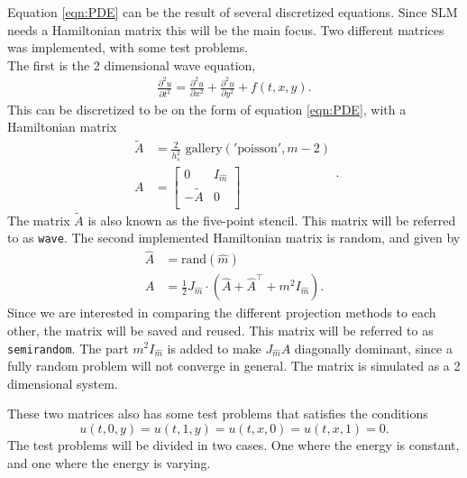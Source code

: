 Equation \eqref{eqn:PDE} can be the result of several discretized equations. Since SLM needs a Hamiltonian matrix this will be the main focus. Two different matrices was implemented, with some test problems.\\

The first is the 2 dimensional wave equation, 
\begin{equation}
\begin{aligned}
\frac{\partial^2 u}{\partial t^2} = \frac{\partial^2 u}{\partial x^2}+ \frac{\partial^2 u}{\partial y^2} + f(t,x,y).
\end{aligned}
\label{eqn:wave}
\end{equation}
This can be discretized to be on the form of equation \eqref{eqn:PDE}, with a Hamiltonian matrix
\begin{equation}
\begin{aligned}
\tilde{A} &= \frac{2}{h_s^2} \text{ gallery}('\text{poisson}', m-2) \\
A &= 
\begin{bmatrix}
 0 & I_{\hat{m}} \\ - \tilde{A} & 0 \\
\end{bmatrix}
\end{aligned}.
\end{equation}
The matrix $\tilde{A}$ is also known as the five-point stencil\cite{fivepoint}. This matrix will be referred to as \texttt{wave}. The second implemented Hamiltonian matrix is random, and given by
\begin{equation}
\begin{aligned}
\hat{A} &= \text{rand}(\hat{m}) \\
A &= \frac{1}{2} J_{\hat{m}} \cdot (\hat{A} + \hat{A}^\top + m^2 I_{\hat{m}}).
\end{aligned}
\end{equation}
Since we are interested in comparing the different projection methods to each other, the matrix will be saved and reused. This matrix will be referred to as \texttt{semirandom}. The part $m^2 I_{\hat{m}} $ is added to make $J_{\hat{m}}A$ diagonally dominant, since a fully random problem will not converge in general. The matrix is simulated as a 2 dimensional system. 

These two matrices also has some test problems that satisfies the conditions $$u(t,0,y) = u(t,1,y) = u(t,x,0) = u(t,x,1) = 0.$$ The test problems will be divided in two cases. One where the energy is constant, and one where the energy is varying. \\

